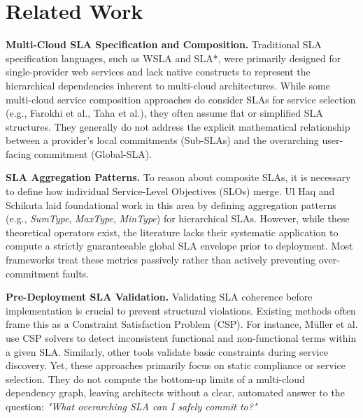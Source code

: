 \documentclass[conference]{IEEEtran}
\begin{document}
\section{Related Work}\label{sec:related}

\textbf{Multi-Cloud SLA Specification and Composition.} 
Traditional SLA specification languages, such as WSLA and SLA*, were primarily designed for single-provider web services and lack native constructs to represent the hierarchical dependencies inherent to multi-cloud architectures. While some multi-cloud service composition approaches do consider SLAs for service selection (e.g., Farokhi et al., Taha et al.), they often assume flat or simplified SLA structures. They generally do not address the explicit mathematical relationship between a provider's local commitments (Sub-SLAs) and the overarching user-facing commitment (Global-SLA). 

\textbf{SLA Aggregation Patterns.} 
To reason about composite SLAs, it is necessary to define how individual Service-Level Objectives (SLOs) merge. Ul Haq and Schikuta laid foundational work in this area by defining aggregation patterns (e.g., \textit{SumType}, \textit{MaxType}, \textit{MinType}) for hierarchical SLAs. However, while these theoretical operators exist, the literature lacks their systematic application to compute a strictly guaranteeable global SLA envelope prior to deployment. Most frameworks treat these metrics passively rather than actively preventing over-commitment faults.

\textbf{Pre-Deployment SLA Validation.} 
Validating SLA coherence before implementation is crucial to prevent structural violations. Existing methods often frame this as a Constraint Satisfaction Problem (CSP). For instance, Müller et al. use CSP solvers to detect inconsistent functional and non-functional terms within a given SLA. Similarly, other tools validate basic constraints during service discovery. Yet, these approaches primarily focus on static compliance or service selection. They do not compute the bottom-up limits of a multi-cloud dependency graph, leaving architects without a clear, automated answer to the question: \textit{"What overarching SLA can I safely commit to?"}


\end{document}
